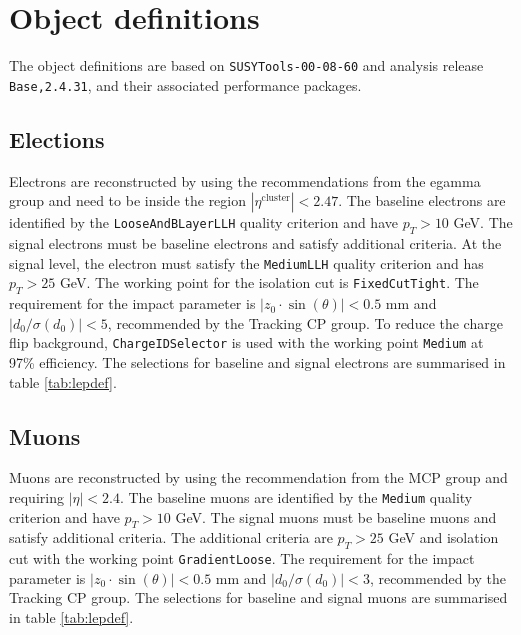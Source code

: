 \section{Object definitions}
\label{sec:object}
The object definitions are based on \texttt{SUSYTools-00-08-60} and analysis release \texttt{Base,2.4.31}, and their associated performance packages.

\subsection{Elections}
Electrons are reconstructed by using the recommendations from the egamma group and need to be inside the region $|\eta^{\text{cluster}}|<2.47$.
The baseline electrons are identified by the \texttt{LooseAndBLayerLLH} quality criterion and have $p_T>10$ GeV.
The signal electrons must be baseline electrons and satisfy additional criteria.
At the signal level, the electron must satisfy the \texttt{MediumLLH} quality criterion and has $p_T>25$ GeV.
The working point for the isolation cut is \texttt{FixedCutTight}.
The requirement for the impact parameter is $|z_0 \cdot \sin (\theta)|< 0.5$ mm and $|d_0/\sigma(d_0)|<5$, recommended by the Tracking CP group.
To reduce the charge flip background, \texttt{ChargeIDSelector} is used with the working point \texttt{Medium} at 97\% efficiency.
The selections for baseline and signal electrons are summarised in table \ref{tab:lepdef}.

\subsection{Muons}
Muons are reconstructed by using the recommendation from the MCP group and requiring $|\eta|<2.4$.
The baseline muons are identified by the \texttt{Medium} quality criterion and have $p_T>10$ GeV.
The signal muons must be baseline muons and satisfy additional criteria.
The additional criteria are $p_T>25$ GeV and isolation cut with the working point \texttt{GradientLoose}.
The requirement for the impact parameter is $|z_0 \cdot \sin (\theta)|< 0.5$ mm and $|d_0/\sigma(d_0)|<3$, recommended by the Tracking CP group.
The selections for baseline and signal muons are summarised in table \ref{tab:lepdef}.

